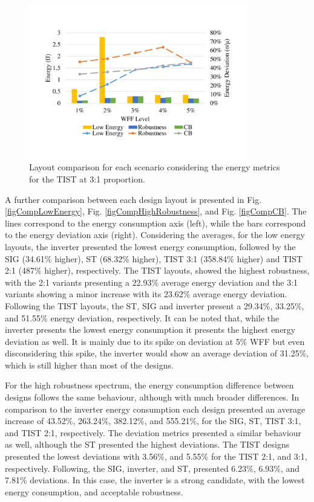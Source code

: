 \documentclass[diss,pgmicro,english]{iiufrgs}
\begin{document}
    \begin{figure}[H]
        \centering
            \includegraphics[width=0.85\textwidth, trim={1.25cm 3cm 2cm 3cm}, clip]{comp3Ltist312Energy.pdf}
            \caption{Layout comparison for each scenario considering the energy metrics for the TIST at 3:1 proportion.}
        \label{figscCompTIST31}
    \end{figure}

A further comparison between each design layout is presented in Fig. \ref{figCompLowEnergy}, Fig. \ref{figCompHighRobustness}, and Fig. \ref{figCompCB}. The lines correspond to the energy consumption axis (left), while the bars correspond to the energy deviation axis (right). Considering the averages, for the low energy layouts, the inverter presented the lowest energy consumption, followed by the SIG (34.61\% higher), ST (68.32\% higher), TIST 3:1 (358.84\% higher) and TIST 2:1 (487\% higher), respectively. The TIST layouts, showed the highest robustness, with the 2:1 variants presenting a 22.93\% average energy deviation and the 3:1 variants showing a minor increase with its 23.62\% average energy deviation. Following the TIST layouts, the ST, SIG and inverter present a 29.34\%, 33.25\%, and 51.55\% energy deviation, respectively. It can be noted that, while the inverter presents the lowest energy consumption it presents the highest energy deviation as well. It is mainly due to its spike on deviation at 5\% WFF but even disconsidering this spike, the inverter would show an average deviation of 31.25\%, which is still higher than most of the designs.

    For the high robustness spectrum, the energy consumption difference between designs follows the same behaviour, although with much broader differences. In comparison to the inverter energy consumption each design presented an average increase of 43.52\%, 263.24\%, 382.12\%, and 555.21\%, for the SIG, ST, TIST 3:1, and TIST 2:1, respectively. The deviation metrics presented a similar behaviour as well, although the ST presented the highest deviations. The TIST designs presented the lowest deviations with 3.56\%, and 5.55\% for the TIST 2:1, and 3:1, respectively. Following, the SIG, inverter, and ST, presented 6.23\%, 6.93\%, and 7.81\% deviations. In this case, the inverter is a strong candidate, with the lowest energy consumption, and acceptable robustness.
\end{document}
